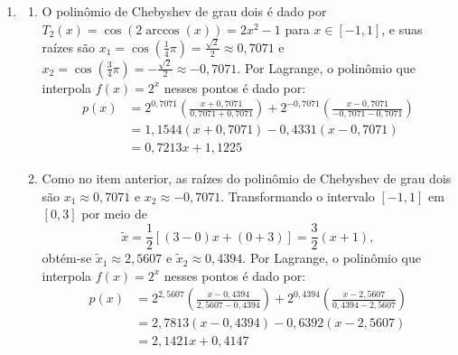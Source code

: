 \documentclass[12pt,a4paper]{article}
\begin{document}
\begin{enumerate}
\item \begin{enumerate}
   \item O polinômio de Chebyshev de grau dois é dado por $T_2(x) = \cos(2\arccos(x)) = 2 x^2 - 1$ para $x \in [-1, 1]$, e suas raízes são $x_1 = \cos\left(\frac{1}{4}\pi\right) = \frac{\sqrt{2}}{2} \approx 0,7071$ e $x_2 = \cos\left(\frac{3}{4}\pi\right) = -\frac{\sqrt{2}}{2} \approx -0,7071$. Por Lagrange, o polinômio que interpola $f(x) = 2^x$ nesses pontos é dado por:
   \begin{align*}
      p(x)
      & = 2^{0,7071} \left(\frac{x+0,7071}{0,7071+0,7071}\right)
      + 2^{-0,7071} \left(\frac{x-0,7071}{-0,7071-0,7071}\right)\\
      & = 1,1544 (x + 0,7071) - 0,4331 (x - 0,7071) \\
      & = 0,7213 x + 1,1225
   \end{align*}
   \item Como no item anterior, as raízes do polinômio de Chebyshev de grau dois são $x_1 \approx 0,7071$ e $x_2 \approx -0,7071$. Transformando o intervalo $[-1, 1]$ em $[0, 3]$ por meio de
   \[
   \tilde{x} = \frac{1}{2}[(3 - 0) x + (0 + 3)] = \frac{3}{2}(x + 1),
   \]
   obtém-se $\tilde{x}_1 \approx 2,5607$ e $\tilde{x}_2 \approx 0,4394$. Por Lagrange, o polinômio que interpola $f(x) = 2^x$ nesses pontos é dado por:
   \begin{align*}
      p(x)
      & = 2^{2,5607} \left(\frac{x - 0,4394}{2,5607 - 0,4394}\right)
      + 2^{0,4394} \left(\frac{x - 2,5607}{0,4394 - 2,5607}\right)\\
      & = 2,7813 (x - 0,4394) - 0,6392 (x - 2,5607) \\
      & = 2,1421 x + 0,4147
   \end{align*}
\end{enumerate}


\end{enumerate}
\end{document}
